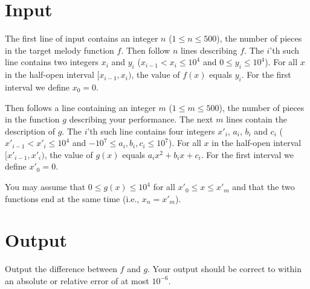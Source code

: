 

\section*{Input}

The first line of input contains an integer $n$ ($1 \le n \le
500$), the number of pieces in the target melody function $f$.  Then follow $n$
lines describing $f$.  The $i$'th such line contains two integers
$x_i$ and $y_i$ ($x_{i-1} < x_i \le 10^4$ and $0 \le y_i \le 10^4$).  For
all $x$ in the half-open interval $[x_{i-1}, x_i)$, the value of
$f(x)$ equals $y_i$.  For the first interval we define $x_0 = 0$.

Then follows a line containing an integer $m$ ($1 \le m \le
500$), the number of pieces in the function $g$ describing your
performance.  The next $m$ lines contain the description of $g$.  The
$i$'th such line contains four integers $x'_i$, $a_i$, $b_i$ and $c_i$
($x'_{i-1} < x'_i \le 10^4$ and $-10^{7} \le a_i, b_i, c_i \le 10^{7}$).
For all $x$ in the half-open interval $[x'_{i-1}, x'_i)$, the value of
$g(x)$ equals $a_ix^2 + b_ix + c_i$.  For the first interval we define
$x'_0 = 0$.

You may assume that $0 \le g(x) \le 10^4$ for all $x'_0 \le x \le
x'_m$ and that the two functions end at the same time (i.e., $x_n =
x'_m$).

\section*{Output}

Output the difference between $f$ and $g$.  Your output should be
correct to within an absolute or relative error of at most $10^{-6}$.
